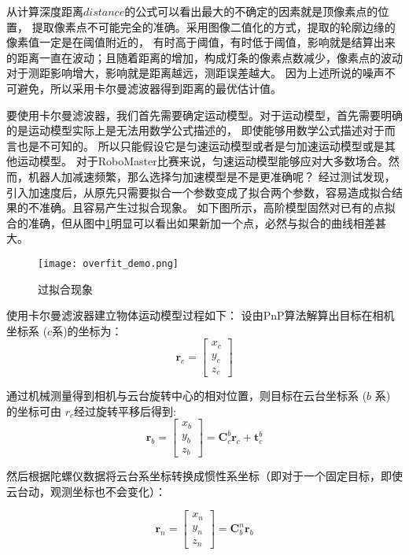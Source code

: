 从计算深度距离$distance$的公式可以看出最大的不确定的因素就是顶像素点的位置，
提取像素点不可能完全的准确。采用图像二值化的方式，提取的轮廓边缘的像素值一定是在阈值附近的，
有时高于阈值，有时低于阈值，影响就是结算出来的距离一直在波动；且随着距离的增加，构成灯条的像素点数减少，像素点的波动对于测距影响增大，影响就是距离越远，测距误差越大。
因为上述所说的噪声不可避免，所以采用卡尔曼滤波器得到距离的最优估计值。\par


要使用卡尔曼滤波器，我们首先需要确定运动模型。对于运动模型，首先需要明确的是运动模型实际上是无法用数学公式描述的，
即使能够用数学公式描述对于而言也是不可知的。 所以只能假设它是匀速运动模型或者是匀加速运动模型或是其他运动模型。
对于RoboMaster比赛来说，匀速运动模型能够应对大多数场合。然而，机器人加减速频繁，那么选择匀加速模型是不是更准确呢？ 
经过测试发现，引入加速度后，从原先只需要拟合一个参数变成了拟合两个参数，容易造成拟合结果的不准确。且容易产生过拟合现象。
如下图所示，高阶模型固然对已有的点拟合的准确，但从图中\ref{过拟合现象}明显可以看出如果新加一个点，必然与拟合的曲线相差甚大。
\begin{figure}[H]
    \centering
    \texttt{[image: overfit\_demo.png]} 
    \caption{过拟合现象} 
    \label{过拟合现象} 
\end{figure} 

使用卡尔曼滤波器建立物体运动模型过程如下：
设由PnP算法解算出目标在相机坐标系 ($c$系)的坐标为：
\begin{equation} \boldsymbol r_c=\left[\begin{array}{c} x_c\\ y_c\\ z_c \end{array}\right] \end{equation}
\par 
通过机械测量得到相机与云台旋转中心的相对位置，则目标在云台坐标系 ($b$ 系) 的坐标可由 $r_c$经过旋转平移后得到:
\begin{equation} \boldsymbol r_b=\left[\begin{array}{c} x_b\\ y_b\\ z_b \end{array}\right] =\boldsymbol C_{c}^{b}\boldsymbol r_c + \boldsymbol t_{c}^{b} \end{equation}
\par 
然后根据陀螺仪数据将云台系坐标转换成惯性系坐标（即对于一个固定目标，即使云台动，观测坐标也不会变化）：


\begin{equation} \boldsymbol r_n=\left[\begin{array}{c} x_n\\ y_n\\ z_n \end{array}\right] =\boldsymbol C_{b}^{n}\boldsymbol r_b \end{equation}

